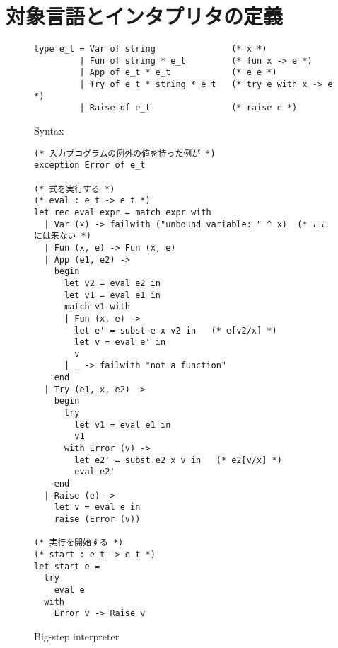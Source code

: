  \section{対象言語とインタプリタの定義}
\label{section:try-with__interpreter}

\begin{figure}
\begin{spacing}{0.8}
\begin{verbatim}
type e_t = Var of string               (* x *)
         | Fun of string * e_t         (* fun x -> e *)
         | App of e_t * e_t            (* e e *)
         | Try of e_t * string * e_t   (* try e with x -> e *)
         | Raise of e_t                (* raise e *)
\end{verbatim}
\end{spacing}
\caption{Syntax}
\label{figure:typee}
\end{figure}

\begin{figure}
\begin{spacing}{0.8}
\begin{verbatim}
(* 入力プログラムの例外の値を持った例が *)
exception Error of e_t

(* 式を実行する *)
(* eval : e_t -> e_t *)
let rec eval expr = match expr with
  | Var (x) -> failwith ("unbound variable: " ^ x)  (* ここには来ない *)
  | Fun (x, e) -> Fun (x, e)
  | App (e1, e2) ->
    begin
      let v2 = eval e2 in
      let v1 = eval e1 in
      match v1 with
      | Fun (x, e) ->
        let e' = subst e x v2 in   (* e[v2/x] *)
        let v = eval e' in
        v
      | _ -> failwith "not a function"
    end
  | Try (e1, x, e2) ->
    begin
      try
        let v1 = eval e1 in
        v1
      with Error (v) ->
        let e2' = subst e2 x v in   (* e2[v/x] *)
        eval e2'
    end
  | Raise (e) ->
    let v = eval e in
    raise (Error (v))

(* 実行を開始する *)
(* start : e_t -> e_t *)
let start e =
  try
    eval e
  with
    Error v -> Raise v
\end{verbatim}
\end{spacing}
\caption{Big-step interpreter}
\label{figure:interpreter}
\end{figure}



